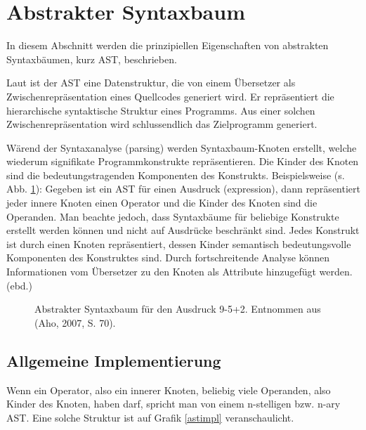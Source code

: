  
\section{Abstrakter Syntaxbaum}\label{ast-sec}
 
In diesem Abschnitt werden die prinzipiellen Eigenschaften von abstrakten Syntaxbäumen, kurz AST, beschrieben.

 
Laut \citep{Aho} ist der AST eine Datenstruktur, die von einem Übersetzer als Zwischenrepräsentation eines Quellcodes generiert wird. Er repräsentiert die hierarchische syntaktische Struktur eines Programms. Aus einer solchen Zwischenrepräsentation wird schlussendlich das Zielprogramm generiert.

 
Wärend der Syntaxanalyse (parsing) werden Syntaxbaum-Knoten erstellt, welche wiederum signifikate Programmkonstrukte repräsentieren. Die Kinder des Knoten sind die bedeutungstragenden Komponenten des Konstrukts. Beispielsweise (s. Abb. \ref{ast}): Gegeben ist ein AST für einen Ausdruck (expression), dann repräsentiert jeder innere Knoten einen Operator und die Kinder des Knoten sind die Operanden. Man beachte jedoch, dass Syntaxbäume für beliebige Konstrukte erstellt werden können und nicht auf Ausdrücke beschränkt sind. Jedes Konstrukt ist durch einen Knoten repräsentiert, dessen Kinder semantisch bedeutungsvolle Komponenten des Konstruktes sind. Durch fortschreitende Analyse können Informationen vom Übersetzer zu den Knoten als Attribute hinzugefügt werden. (ebd.)

 
\begin{figure}[h!]
\centering
\advance\leftskip-2.5cm
\caption{ Abstrakter Syntaxbaum für den Ausdruck 9-5+2. Entnommen aus (Aho, 2007, S. 70). }\label{ast}
\end{figure}
 
\subsection{Allgemeine Implementierung}\label{}
 
Wenn ein Operator, also ein innerer Knoten, beliebig viele Operanden, also Kinder des Knoten, haben darf, spricht man von einem n-stelligen bzw. n-ary AST. \citep{Edwards} Eine solche Struktur ist auf Grafik \ref{astimpl} veranschaulicht.


